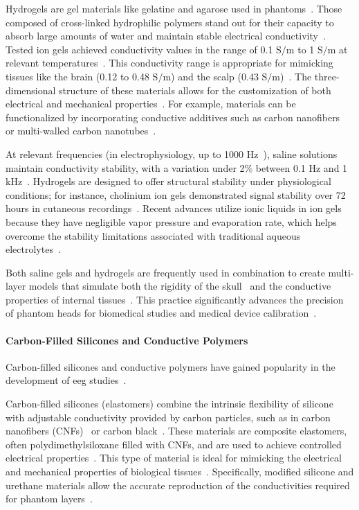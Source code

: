 Hydrogels are gel materials like gelatine and agarose used in phantoms~\cite{Owda2020}. Those composed of cross-linked hydrophilic polymers stand out for their capacity to absorb large amounts of water and maintain stable electrical conductivity~\cite{C5TC01888A}. Tested ion gels achieved conductivity values in the range of 0.1 $\text{S/m}$ to 1 $\text{S/m}$ at relevant temperatures~\cite{C5TC01888A}. This conductivity range is appropriate for mimicking tissues like the brain (0.12 to 0.48 $\text{S/m}$) and the scalp (0.43 $\text{S/m}$)~\cite{Owda2020}. The three-dimensional structure of these materials allows for the customization of both electrical and mechanical properties~\cite{Uhrhan2024}. For example, materials can be functionalized by incorporating conductive additives such as carbon nanofibers~\cite{Slipher2018} or multi-walled carbon nanotubes~\cite{MAGSOOD2021111705}.

At relevant frequencies (in electrophysiology, up to 1000 Hz~\cite{9475461}), saline solutions maintain conductivity stability, with a variation under 2\% between 0.1 Hz and 1 kHz~\cite{Chandra2000}. Hydrogels are designed to offer structural stability under physiological conditions; for instance, cholinium ion gels demonstrated signal stability over 72 hours in cutaneous recordings~\cite{C5TC01888A}. Recent advances utilize ionic liquids in ion gels because they have negligible vapor pressure and evaporation rate, which helps overcome the stability limitations associated with traditional aqueous electrolytes~\cite{C5TC01888A}.

Both saline gels and hydrogels are frequently used in combination to create multi-layer models that simulate both the rigidity of the skull~\cite{Collier2012} and the conductive properties of internal tissues~\cite{Owda2020}. This practice significantly advances the precision of phantom heads for biomedical studies and medical device calibration~\cite{Collier2012}.

\paragraph*{Carbon-Filled Silicones and Conductive Polymers}

Carbon-filled silicones and conductive polymers have gained popularity in the development of \gls{eeg} studies~\cite{Collier2012}.

Carbon-filled silicones (elastomers) combine the intrinsic flexibility of silicone with adjustable conductivity provided by carbon particles, such as in carbon nanofibers (CNFs)~\cite{Slipher2018} or carbon black~\cite{akor-2025}. These materials are composite elastomers, often polydimethylsiloxane filled with CNFs, and are used to achieve controlled electrical properties~\cite{akor-2025}. This type of material is ideal for mimicking the electrical and mechanical properties of biological tissues~\cite{Collier2012}. Specifically, modified silicone and urethane materials allow the accurate reproduction of the conductivities required for phantom layers~\cite{Collier2012}.

